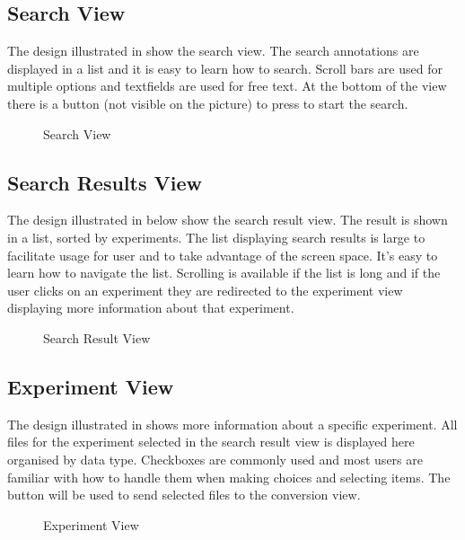 \subsection{Search View}
The design illustrated in  show the search view. The search annotations are displayed in a list and it is easy to learn how to search. Scroll bars are used for multiple options and textfields are used for free text. At the bottom of the view there is a button (not visible on the picture) to press to start the search.

\begin{figure}[ht]
\caption{Search View}
\label{fig:and_search}
\end{figure}
\FloatBarrier

\subsection{Search Results View}
The design illustrated in  below show the search result view. The result is shown in a list, sorted by experiments. The list displaying search results is large to facilitate usage for user and to take advantage of the screen space. It's easy to learn how to navigate the list. Scrolling is available if the list is long and if the user clicks on an experiment they are redirected to the experiment view displaying more information about that experiment.

\begin{figure}[ht]
\caption{Search Result View}
\label{fig:and_result}
\end{figure}
\FloatBarrier

\subsection{Experiment View}
The design illustrated in  shows more information about a specific experiment. All files for the experiment selected in the search result view is displayed here organised by data type. Checkboxes are commonly used and most users are familiar with how to handle them when making choices and selecting items. The button  will be used to send selected files to the conversion view.

\begin{figure}[ht]
\caption{\label{fig:and_experiment}Experiment View}
\end{figure}
\FloatBarrier

